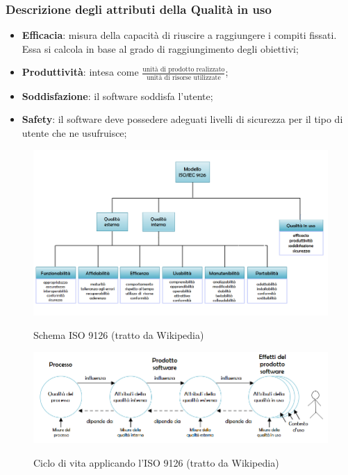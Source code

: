 		\subsubsection{Descrizione degli attributi della Qualità in uso}
		\begin{itemize}
			\item \textbf{Efficacia}: misura della capacità di riuscire a raggiungere i compiti fissati. Essa si calcola
			in base al grado di raggiungimento degli obiettivi;
			\item \textbf{Produttività}: intesa come $ \frac{\text{unità di prodotto realizzato}}{\text{unità di risorse utilizzate}} $;
			\item \textbf{Soddisfazione}: il software soddisfa l'utente;
			\item \textbf{Safety}: il software deve possedere adeguati livelli di sicurezza per il tipo di utente che ne usufruisce;
		\end{itemize}
	
	\begin{figure}[h]
		\includegraphics[width=\textwidth]{img/ISO9126.png}
		\label{fig:iso9126}
		\caption[Schema ISO 9126]{Schema ISO 9126 (tratto da Wikipedia)}
	\end{figure}

	
	
	\begin{figure}[h]
		\includegraphics[width=\textwidth]{img/Ciclo_di_vita_9126.png}
		\label{fig:ciclo_di_vita}
		\caption[Ciclo di vita con l'ISO 0126]{Ciclo di vita applicando l'ISO 9126 (tratto da Wikipedia)}
	\end{figure}